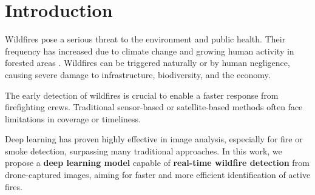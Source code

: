 \section{Introduction}
\label{sec:introduction}

Wildfires pose a serious threat to the environment and public health.
Their frequency has increased due to climate change and growing human activity in forested areas \cite{Bot2022}.
Wildfires can be triggered naturally or by human negligence, causing severe damage to
infrastructure, biodiversity, and the economy.

The early detection of wildfires is crucial to enable a faster response from firefighting crews.
Traditional sensor-based or satellite-based methods often face limitations in coverage or timeliness.

Deep learning has proven highly effective in image analysis, especially for fire or smoke
detection, surpassing many traditional approaches.
In this work, we propose a \textbf{deep learning model} capable of \textbf{real-time wildfire detection} from
drone-captured images, aiming for faster and more efficient identification of active fires.
